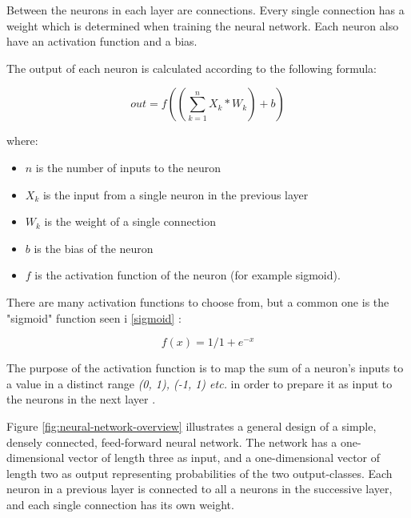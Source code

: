 \documentclass[12pt, a4paper, onecolumn]{article}
\begin{document}
	Between the neurons in each layer are connections. Every single connection has a weight which is determined when training the neural network. Each neuron also have an activation function and a bias.
	
	\newpage
	
	The output of each neuron is calculated according to the following formula:
	
	\begin{equation}
	\label{neuron-formula}
	out = f((\sum_{k=1}^{n} X_{k} * W_{k}) + b)
	\end{equation}
	
	where:
	
	
	\begin{itemize}
		\item $n$ is the number of inputs to the neuron
		\item $X_{k}$ is the input from a single neuron in the previous layer
		\item $W_{k}$ is the weight of a single connection
		\item $b$ is the bias of the neuron
		\item $f$ is the activation function of the neuron (for example sigmoid).
	\end{itemize}
	
	
	There are many activation functions to choose from, but a common one is the "sigmoid" function seen i \ref{sigmoid} \cite{towards-data-sci}:
	
	\begin{equation}
	\label{sigmoid}
	f(x)=1/1 + e^{-x}
	\end{equation}
	
	The purpose of the activation function is to map the sum of a neuron's inputs to a value in a distinct range \textit{(0, 1), (-1, 1) etc.} in order to prepare it as input to the neurons in the next layer \cite{towards-data-sci}. 
	
	Figure \ref{fig:neural-network-overview} illustrates a general design of a simple, densely connected, feed-forward neural network. The network has a one-dimensional vector of length three as input, and a one-dimensional vector of length two as output representing probabilities of the two output-classes. Each neuron in a previous layer is connected to all a neurons in the successive layer, and each single connection has its own weight. 
	
\end{document}
